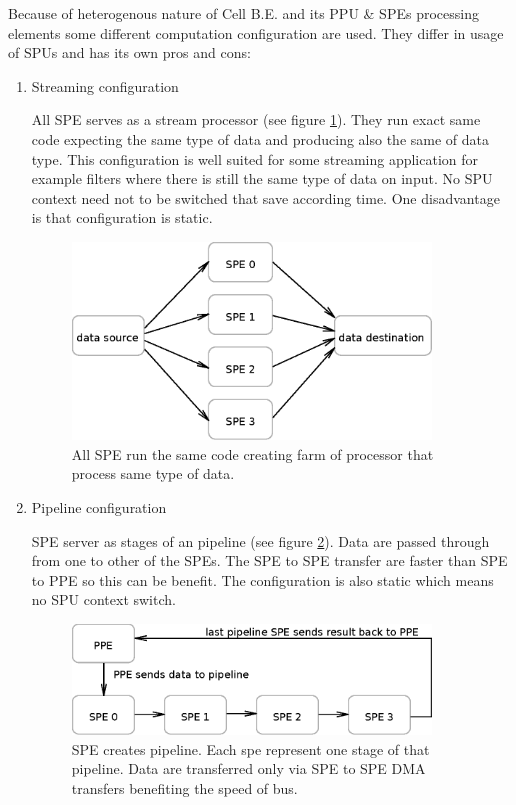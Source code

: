 \par
Because of heterogenous nature of Cell B.E. and its PPU \& SPEs processing elements some different computation configuration are used.
 They differ in usage of SPUs and has its own pros and cons:
\begin{enumerate}
\item Streaming configuration
\par
All SPE serves as a stream processor (see figure \ref{fg:streamingModel}).
They run exact same code expecting the same type of data and producing also the same of data type.
This configuration is well suited for some streaming application for example filters where there is still the same type of data on input.
No SPU context need not to be switched that save according time.
One disadvantage is that configuration is static.

\begin{figure}
    \centering
    \includegraphics[width=0.9\textwidth]{data/streamingModel}
    \caption[Streaming SPE configuration]{All SPE run the same code creating farm of processor that process same type of data.}
    \label{fg:streamingModel}
\end{figure}

\item Pipeline configuration
\par
SPE server as stages of an pipeline (see figure \ref{fg:pipelineModel}).
Data are passed through from one to other of the SPEs.
The SPE to SPE transfer are faster than SPE to PPE so this can be benefit.
The configuration is also static which means no SPU context switch.

\begin{figure}
    \centering
    \includegraphics[width=0.9\textwidth]{data/pipelineModel}
    \caption[Pipeline SPE configuration]{SPE creates pipeline. Each spe represent one stage of that pipeline. Data are transferred only via SPE to SPE DMA transfers benefiting the speed of bus.}
    \label{fg:pipelineModel}
\end{figure}


\end{enumerate}
